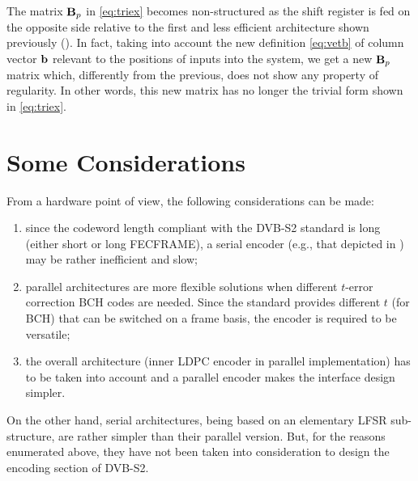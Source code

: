 The matrix $\mathbf{B}_p$ in \eqref{eq:triex} becomes non-structured as the shift register is fed on the opposite side relative to the first and less efficient architecture shown previously (). In fact, taking into account the new definition \eqref{eq:vetb} of column vector $\mathbf{b}$ relevant to the positions of inputs into the system, we get a new \(\mathbf{B}_p\) matrix which, differently from the previous, does not show any property of regularity. In other words, this new matrix has no longer the trivial form shown in \eqref{eq:triex}.

\section{Some Considerations}

From a hardware point of view, the following considerations can be made:
\begin{enumerate}
\item since the codeword length compliant with the DVB-S2 standard is long (either short or long FECFRAME), a serial encoder (e.g., that depicted in ) may be rather inefficient and slow;
\item parallel architectures are more flexible solutions when different \(t\)-error correction BCH codes are needed.  Since the standard provides different \(t\) (for BCH) that can be switched on a frame basis, the encoder is required to be versatile;
\item the overall architecture (inner LDPC encoder in parallel implementation) has to be taken into account and a parallel encoder makes the interface design simpler.
\end{enumerate}
On the other hand, serial architectures, being based on an elementary LFSR sub-structure, are rather simpler than their parallel version. But, for the reasons enumerated above, they have not been taken into consideration to design the encoding section of DVB-S2.







